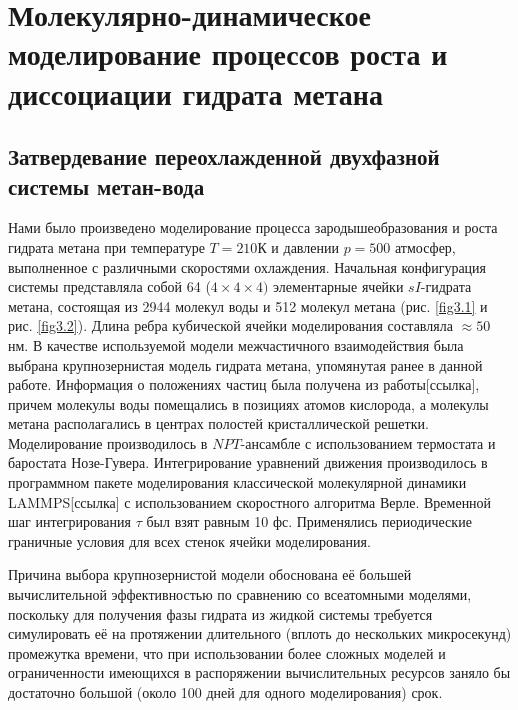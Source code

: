 \chapter{Молекулярно-динамическое моделирование процессов роста и диссоциации гидрата метана}
\section{Затвердевание переохлажденной двухфазной системы метан-вода}
Нами было произведено моделирование процесса зародышеобразования и роста гидрата метана при температуре $T=210$К и давлении $p=500$ атмосфер, выполненное с различными скоростями охлаждения. Начальная конфигурация системы представляла собой 64 ($4\times 4\times 4)$ элементарные ячейки $sI$-гидрата метана, состоящая из 2944 молекул воды и 512 молекул метана (рис. \ref{fig3.1} и рис. \ref{fig3.2}). Длина ребра кубической ячейки моделирования составляла $\approx 50$ нм. В качестве используемой модели межчастичного взаимодействия была выбрана крупнозернистая модель гидрата метана, упомянутая ранее в данной работе. Информация о положениях частиц была получена из работы[ссылка], причем молекулы воды помещались в позициях атомов кислорода, а молекулы метана располагались в центрах полостей кристаллической решетки. Моделирование производилось в $NPT$-ансамбле с использованием термостата и баростата Нозе-Гувера. Интегрирование уравнений движения производилось в программном пакете моделирования классической молекулярной динамики LAMMPS[ссылка] с использованием скоростного алгоритма Верле. Временной шаг интегрирования $\tau$ был взят равным 10 фс. Применялись периодические граничные условия для всех стенок ячейки моделирования.

Причина выбора крупнозернистой модели обоснована её большей вычислительной эффективностью по сравнению со всеатомными моделями, поскольку для получения фазы гидрата из жидкой системы требуется симулировать её на протяжении длительного (вплоть до нескольких микросекунд) промежутка времени, что при использовании более сложных моделей и ограниченности имеющихся в распоряжении вычислительных ресурсов заняло бы достаточно большой (около 100 дней для одного моделирования) срок.

